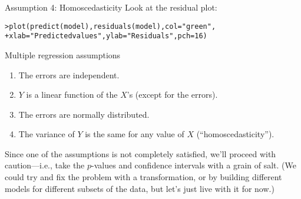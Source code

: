 \documentclass{beamer}\usepackage[]{graphicx}\usepackage[]{color}
\makeatletter
\newcommand{\hlnum}[1]{\textcolor[rgb]{0.824,0.412,0.118}{#1}}%
\newcommand{\hlstr}[1]{\textcolor[rgb]{1,0.894,0.71}{#1}}%
\newcommand{\hlstd}[1]{\textcolor[rgb]{1,0.894,0.769}{#1}}%
\newcommand{\hlkwc}[1]{\textcolor[rgb]{0.78,0.941,0.545}{#1}}%
\newcommand{\hlkwd}[1]{\textcolor[rgb]{1,0.78,0.769}{#1}}%
\newenvironment{kframe}{%
 \def\at@end@of@kframe{}%
 \ifinner\ifhmode%
  \def\at@end@of@kframe{\end{minipage}}%
  \begin{minipage}{\columnwidth}%
 \fi\fi%
 \def\FrameCommand##1{\hskip\@totalleftmargin \hskip-\fboxsep
 \colorbox{shadecolor}{##1}\hskip-\fboxsep
     \hskip-\linewidth \hskip-\@totalleftmargin \hskip\columnwidth}%
 \MakeFramed {\advance\hsize-\width
   \@totalleftmargin\z@ \linewidth\hsize
   \@setminipage}}%
 {\par\unskip\endMakeFramed%
 \at@end@of@kframe}
\newenvironment{knitrout}{}{} %
\makeatother
\begin{document}
\begin{darkframes}
    \begin{frame}[fragile]{Assumption 4: Homoscedasticity}
      Look at the residual plot:
      \fontsm
\begin{knitrout}
\begin{kframe}
\begin{alltt}
\hlstd{> }\hlkwd{plot}\hlstd{(}\hlkwd{predict}\hlstd{(model),} \hlkwd{residuals}\hlstd{(model),} \hlkwc{col}\hlstd{=}\hlstr{"green"}\hlstd{,}
\hlstd{+ }  \hlkwc{xlab}\hlstd{=}\hlstr{"Predicted values"}\hlstd{,} \hlkwc{ylab}\hlstd{=}\hlstr{"Residuals"}\hlstd{,} \hlkwc{pch}\hlstd{=}\hlnum{16}\hlstd{)}
\end{alltt}
\end{kframe}


\end{knitrout}
    \end{frame}

    \begin{frame}{Multiple regression assumptions}
      \begin{enumerate}
        \item The errors are independent. \greencheckmark
        \item $Y$ is a linear function of the $X$'s (except for the errors). \greencheckmark
        \item The errors are normally distributed. \greencheckmark
        \item The variance of $Y$ is the same for any value of $X$ (``homoscedasticity''). \shrug[red]
      \end{enumerate}
    \end{frame}

    \begin{frame}
      \begin{center}
        Since one of the assumptions is not completely satisfied, we'll proceed with caution---i.e., take the $p$-values and confidence intervals with a grain of salt.  (We could try and fix the problem with a transformation, or by building different models for different subsets of the data, but let's just live with it for now.)
      \end{center}
    \end{frame}


\end{darkframes}
\end{document}
